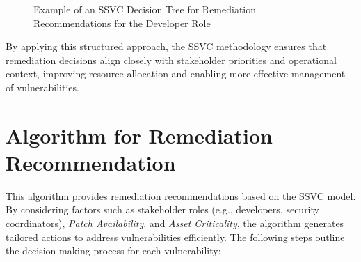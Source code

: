 \begin{figure}[H]
\centering
{}
\caption{Example of an \ac{SSVC} Decision Tree for Remediation Recommendations for the Developer Role}
\label{fig:ssvc-remediation-developer}
\end{figure}

By applying this structured approach, the \ac{SSVC} methodology ensures that remediation decisions align closely with stakeholder priorities and operational context, improving resource allocation and enabling more effective management of vulnerabilities.

\section{Algorithm for Remediation Recommendation}
\label{sec:algorithm-remediation}

This algorithm provides remediation recommendations based on the \ac{SSVC} model. By considering factors such as stakeholder roles (e.g., developers, security coordinators), \emph{Patch Availability}, and \emph{Asset Criticality}, the algorithm generates tailored actions to address vulnerabilities efficiently. The following steps outline the decision-making process for each vulnerability:

